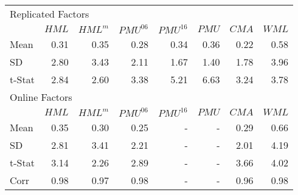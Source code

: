 \begin{table}[!ht]
\begin{tabular}{lrrrrrrr}
  \toprule
  \multicolumn{8}{l}{Replicated Factors} \\
         & $HML$  & $HML^m$&$PMU^{06}$&$PMU^{16}$&$PMU$& $CMA$ & $WML$ \\
  Mean   &  0.31  &  0.35  &  0.28  &  0.34  &  0.36  &  0.22  &  0.58 \\
  SD     &  2.80  &  3.43  &  2.11  &  1.67  &  1.40  &  1.78  &  3.96 \\
  t-Stat &  2.84  &  2.60  &  3.38  &  5.21  &  6.63  &  3.24  &  3.78 \\
[1em]
  \multicolumn{8}{l}{Online Factors} \\
         & $HML$  & $HML^m$&$PMU^{06}$&$PMU^{16}$&$PMU$& $CMA$ & $WML$ \\
  Mean   &  0.35  &  0.30  &  0.25  &    -   &    -   &  0.29  &  0.66 \\
  SD     &  2.81  &  3.41  &  2.21  &    -   &    -   &  2.01  &  4.19 \\
  t-Stat &  3.14  &  2.26  &  2.89  &    -   &    -   &  3.66  &  4.02 \\
[1em]
  Corr   &  0.98  &  0.97  &  0.98  &    -   &    -   &  0.96  &  0.98 \\
  \bottomrule
\end{tabular}
\label{tbl:replicated_factors}
\end{table}
